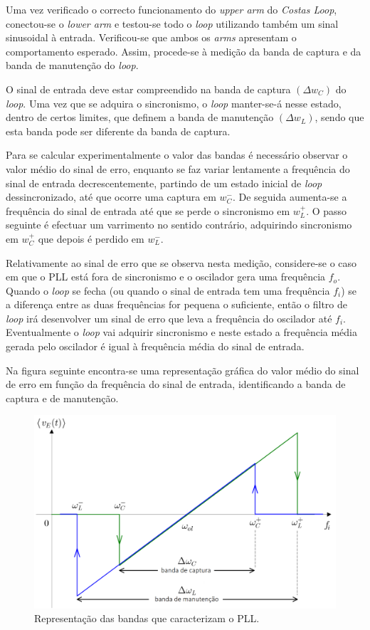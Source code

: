 \documentclass[11pt]{article}
\numberwithin{equation}{section}
\begin{document}
Uma vez verificado o correcto funcionamento do \textit{upper arm} do \textit{Costas Loop}, conectou-se o \textit{lower arm} e testou-se todo o \textit{loop} utilizando também um sinal sinusoidal à entrada. Verificou-se que ambos os \textit{arms} apresentam o comportamento esperado. Assim, procede-se à medição da banda de captura e da banda de manutenção do \textit{loop}.

O sinal de entrada deve estar compreendido na banda de captura $\left(\Delta w_{C}\right)$ do \textit{loop}. Uma vez que se adquira o sincronismo, o \textit{loop} manter-se-á nesse estado, dentro de certos limites, que definem a banda de manutenção $\left(\Delta w_{L}\right)$, sendo que esta banda pode ser diferente da banda de captura. 

Para se calcular experimentalmente o valor das bandas é necessário observar o valor médio do sinal de erro, enquanto se faz variar lentamente a frequência do sinal de entrada decrescentemente, partindo de um estado inicial de \textit{loop} dessincronizado, até que ocorre uma captura em $w_{C}^{-}$. De seguida aumenta-se a frequência do sinal de entrada até que se perde o sincronismo em $w_{L}^{+}$. O passo seguinte é efectuar um varrimento no sentido contrário, adquirindo sincronismo em $w_{C}^{+}$ que depois é perdido em $w_{L}^{-}$.

Relativamente ao sinal de erro que se observa nesta medição, considere-se o caso em que o PLL está fora de sincronismo e o oscilador gera uma frequência $f_o$. Quando o \textit{loop} se fecha (ou quando o sinal de entrada tem uma frequência $f_i$) se a diferença entre as duas frequências for pequena o suficiente, então o filtro de  \textit{loop} irá desenvolver um sinal de erro que leva a frequência do oscilador até $f_i$. Eventualmente o \textit{loop} vai adquirir sincronismo e neste estado a frequência média gerada pelo oscilador é igual à frequência média do sinal de entrada.

Na figura seguinte encontra-se uma representação gráfica do valor médio do sinal de erro em função da frequência do sinal de entrada, identificando a banda de captura e de manutenção.

\begin{figure}[H]
	\centering
	\includegraphics[keepaspectratio=true, scale=0.25]{teoricas/malhas}
	\caption{Representação das bandas que caracterizam o PLL.}
	\vspace{-0.8em}
\end{figure} 
\end{document}
